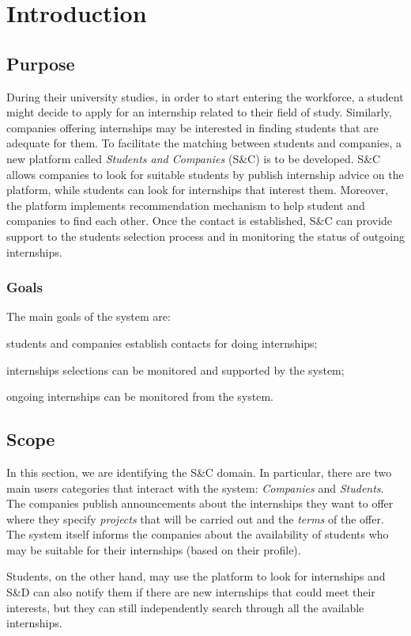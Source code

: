 \chapter{Introduction}
	\section{Purpose}
		During their university studies, in order to start entering the workforce, a student might decide to apply for an internship related to their field of study. Similarly, companies offering internships may be interested in finding students that are adequate for them. To facilitate the matching between students and companies, a new platform called \emph{Students and Companies} (S\&C) is to be developed. S\&C allows companies to look for suitable students by publish internship advice on the platform, while students can look for internships that interest them. Moreover, the platform implements recommendation mechanism to help student and companies to find each other. Once the contact is established, S\&C can provide support to the students selection process and in monitoring the status of outgoing internships.
		\subsection{Goals}
			The main goals of the system are:
			
			\quad [G1]\quad students and companies establish contacts for doing internships;
			
			\quad [G2]\quad internships selections can be monitored and supported by the system;
			
			\quad [G3]\quad ongoing internships can be monitored from the system.
	\section{Scope}
		In this section, we are identifying the S\&C domain. In particular, there are two main users categories that interact with the system: \emph{Companies} and \emph{Students}. The companies publish announcements about the internships they want to offer where they specify \emph{projects} that will be carried out and the \emph{terms} of the offer. The system itself informs the companies about the availability of students who may be suitable for their internships (based on their profile).
		
		Students, on the other hand, may use the platform to look for internships and S\&D can also notify them if there are new internships that could meet their interests, but they can still independently search through all the available internships.
		
